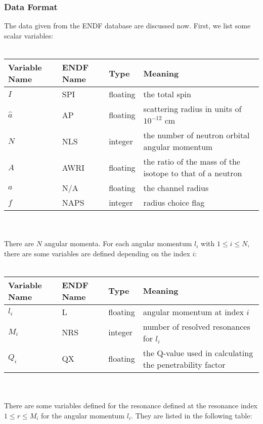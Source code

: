 \subsubsection{Data Format}
The data given from the ENDF database are discussed now. First, we list some scalar variables:
\\\\
\begin{small}
\begin{tabular}{l l l L{6cm}}
Variable Name & ENDF Name & Type & Meaning \\\hline
$I$ & SPI & floating & the total spin \\
$\hat{a}$ & AP & floating & scattering radius in units of $10^{-12}$ cm \\
$N$ & NLS & integer & the number of neutron orbital angular momentum \\
$A$ & AWRI & floating & the ratio of the mass of the isotope to that of a neutron \\
$a$ & N/A & floating & the channel radius \\
$f$ & NAPS & integer & radius choice flag\\
\end{tabular}
\end{small}
\\\\
There are $N$ angular momenta. For each angular momentum $l_i$ with $1\leq i\leq N$, there are some variables are defined depending on the index $i$:
\\\\
\begin{small}
\begin{tabular}{l l l L{6cm}}
Variable Name & ENDF Name & Type & Meaning \\\hline
$l_i$ & L & floating & angular momentum at index $i$\\
$M_i$ & NRS & integer & number of resolved resonances for $l_i$ \\
$Q_i$ & QX & floating & the Q-value used in calculating the penetrability factor \\
\end{tabular}
\end{small}
\\\\
There are some variables defined for the resonance defined at the resonance index $1\leq r\leq M_i$ for the angular momentum $l_i$. They are listed in the following table:
\\\\
